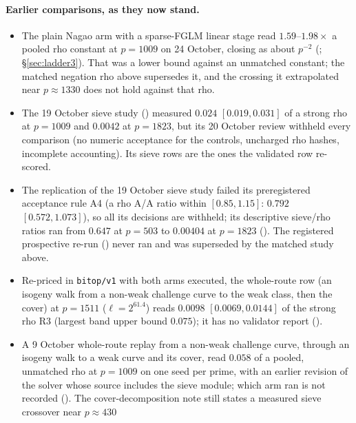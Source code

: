 \paragraph{Earlier comparisons, as they now stand.}
\begin{itemize}
\item The plain Nagao arm with a sparse-FGLM linear stage read
  $1.59$--$1.98\times$ a pooled rho constant at $p=1009$ on 24 October, closing
  as about $p^{-2}$ (;
  \S\ref{sec:ladder3}). That was a lower bound against an unmatched
  constant; the matched negation rho above supersedes it, and the crossing
  it extrapolated near $p\approx1330$ does not hold against that rho.
\item The 19 October sieve study ()
  measured $0.024$ $[0.019,0.031]$ of a strong rho at $p=1009$ and $0.0042$ at
  $p=1823$, but its 20 October review withheld every comparison (no numeric
  acceptance for the controls, uncharged rho hashes, incomplete accounting).
  Its sieve rows are the ones the validated row re-scored.
\item The replication of the 19 October sieve study failed its preregistered
  acceptance rule A4 (a rho A/A ratio within $[0.85,1.15]$: $0.792$
  $[0.572,1.073]$), so all its decisions are withheld; its descriptive
  sieve/rho ratios ran from $0.647$ at $p=503$ to $0.00404$ at $p=1823$
  (). The registered
  prospective re-run () never ran
  and was superseded by the matched study above.
\item Re-priced in \texttt{bitop/v1} with both arms executed, the whole-route
  row (an isogeny walk from a non-weak challenge curve to the weak class,
  then the cover) at $p=1511$ ($\ell=2^{61.4}$) reads $0.0098$
  $[0.0069,0.0144]$ of the strong rho R3 (largest band upper bound $0.075$);
  it has no validator report
  ().
\item A 9 October whole-route replay from a non-weak challenge curve, through
  an isogeny walk to a weak curve and its cover, read $0.058$ of a pooled,
  unmatched rho at $p=1009$ on one seed per prime, with an earlier revision of
  the solver whose source includes the sieve module; which arm ran is not
  recorded (). The
  cover-decomposition note still states a measured sieve crossover near
  $p\approx430$

\end{itemize}
